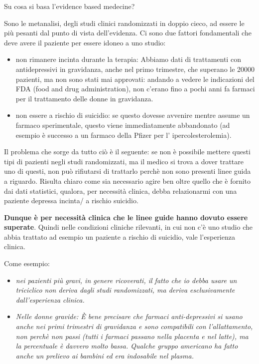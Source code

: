 \documentclass[]{article}
\begin{document}
Su cosa si basa l'evidence based medecine?

Sono le metanalisi, degli studi clinici randomizzati in doppio cieco, ad
essere le più pesanti dal punto di vista dell'evidenza. Ci sono due
fattori fondamentali che deve avere il paziente per essere idoneo a uno
studio:

\begin{itemize}
\item
  non rimanere incinta durante la terapia: Abbiamo dati di trattamenti
  con antidepressivi in gravidanza, anche nel primo trimestre, che
  superano le 20000 pazienti, ma non sono stati mai approvati: andando a
  vedere le indicazioni del FDA (food and drug administration), non
  c'erano fino a pochi anni fa farmaci per il trattamento delle donne in
  gravidanza.
\item
  non essere a rischio di suicidio: se questo dovesse avvenire mentre
  assume un farmaco sperimentale, questo viene immediatamente
  abbandonato (ad esempio è successo a un farmaco della Pfizer per l'
  ipercolesterolemia).
\end{itemize}

Il problema che sorge da tutto ciò è il seguente: se non è possibile
mettere questi tipi di pazienti negli studi randomizzati, ma il medico
si trova a dover trattare uno di questi, non può rifiutarsi di trattarlo
perchè non sono presenti linee guida a riguardo. Risulta chiaro come sia
necessario agire ben oltre quello che è fornito dai dati statistici,
qualora, per necessità clinica, debba relazionarmi con una paziente
depressa incinta/ a rischio suicidio.

\textbf{Dunque è per necessità clinica che le linee guide hanno dovuto
essere superate}. Quindi nelle condizioni cliniche rilevanti, in cui non
c'è uno studio che abbia trattato ad esempio un paziente a rischio di
suicidio, vale l'esperienza clinica.

Come esempio:

\begin{itemize}
\item
  \emph{nei pazienti più gravi, in genere ricoverati, il fatto che io
  debba usare un triciclico non deriva dagli studi randomizzati, ma
  deriva esclusivamente dall'esperienza clinica.}
\item
  \emph{Nelle donne gravide: È bene precisare che farmaci
  anti-depressivi si usano anche nei primi trimestri di gravidanza e
  sono compatibili con l'allattamento, non perchè non passi (tutti i
  farmaci passano nella placenta e nel latte), ma la percentuale è
  davvero molto bassa. Qualche gruppo americano ha fatto anche un
  prelievo ai bambini ed era indosabile nel plasma.}
\end{itemize}
\end{document}
